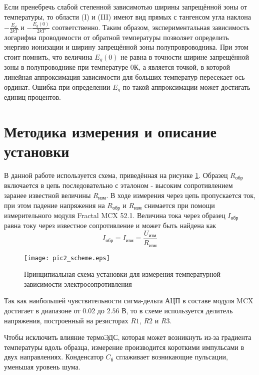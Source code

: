 Если пренебречь слабой степенной зависимотью ширины запрещённой зоны от температуры, то области (I) и (III) имеют вид прямых с тангенсом угла наклона $-\frac{E_{d}}{2 k T}$ и $-\frac{E_{g}(0)}{2 k T}$ соответственно. Таким образом, экспериментальная зависимость логарифма проводимости от обратной температуры позволяет определить энергию ионизации и ширину запрещённой зоны полупровроводника. При этом стоит помнить, что величина $E_{g}(0)$ не равна в точности ширине запрещённой зоны в полупроводнике при температуре 0\textdegree К, а является точкой, в которой линейная аппроксимация зависимости для больших температур пересекает ось ординат. Ошибка при определении $E_{g}$ по такой аппроксимации может достигать единиц процентов.

\section{Методика измерения и описание установки}

В данной работе используется схема, приведённая на рисунке \ref{pic2_scheme}. Образец $R_{\text{обр}}$ включается в цепь последовательно с эталоном - высоким сопротивлением заранее известной величины $R_{\text{изм}}$. В ходе измерения через цепь пропускается ток, при этом падение напряжения на $R_{\text{обр}}$ и $R_{\text{изм}}$ снимается при помощи измерительного модуля Fractal MCX 52.1. Величина тока через образец $I_{\text{обр}}$ равна току через известное сопротивление и может быть найдена как
\begin{equation}
I_{\text{обр}} = I_{\text{изм}} = \frac{U_{\text{изм}}}{R_{\text{изм}}}
\end{equation}

\begin{figure}[h!]\centering
\texttt{[image: pic2\_scheme.eps]}
\caption{Принципиальная схема установки для измерения температурной зависимости электросопротивления}
\label{pic2_scheme}
\end{figure}

Так как наибольшей чувствительности сигма-дельта АЦП в составе модуля MCX достигает в диапазоне от $0.02$ до $2.56$ В, то в схеме используется делитель напряжения, построенный на резисторах $R1$, $R2$ и $R3$.

Чтобы исключить влияние термоЭДС, которая может возникнуть из-за градиента температуры вдоль образца, измерение производится короткими импульсами в двух направлениях. Конденсатор $C_{\text{б}}$ сглаживает возникающие пульсации, уменьшая уровень шума.

